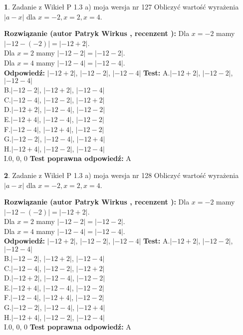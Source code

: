 \documentclass[12pt, a4paper]{article}
\theoremstyle{definition} %
\newtheorem{zad}{}
\newcommand{\zadStart}[1]{\begin{zad}#1\newline}
\newcommand{\zadStop}{\end{zad}}
\newcommand{\rozwStart}[2]{\noindent \textbf{Rozwiązanie (autor #1 , recenzent #2): }\newline}
\newcommand{\rozwStop}{\newline}
\newcommand{\odpStart}{\noindent \textbf{Odpowiedź:}\newline}
\newcommand{\odpStop}{\newline}
\newcommand{\testStart}{\noindent \textbf{Test:}\newline}
\newcommand{\testStop}{\newline}
\newcommand{\kluczStart}{\noindent \textbf{Test poprawna odpowiedź:}\newline}
\newcommand{\kluczStop}{\newline}
\begin{document}
\zadStart{Zadanie z Wikieł P 1.3 a) moja wersja nr 127}
Obliczyć wartość wyrażenia $|a - x|$ dla $x=-2,x=2,x=4$.
\zadStop
\rozwStart{Patryk Wirkus}{}
Dla $x = -2$ mamy $|-12 - (-2)| = |-12 + 2|$.\\
Dla $x = 2$ mamy $|-12 - 2| = |-12 - 2|$.\\
Dla $x = 4$ mamy $|-12 - 4| = |-12 - 4|$.\\
\rozwStop
\odpStart
$|-12 + 2|$, $|-12 - 2|$, $|-12 - 4|$
\odpStop
\testStart
A.$|-12 + 2|$, $|-12 - 2|$, $|-12 - 4|$\\
B.$|-12 - 2|$, $|-12 + 2|$, $|-12 - 4|$\\
C.$|-12 - 4|$, $|-12 - 2|$, $|-12 + 2|$\\
D.$|-12 + 2|$, $|-12 - 4|$, $|-12 - 2|$\\
E.$|-12 + 4|$, $|-12 - 4|$, $|-12 - 2|$\\
F.$|-12 - 4|$, $|-12 + 4|$, $|-12 - 2|$\\
G.$|-12 - 2|$, $|-12 - 4|$, $|-12 + 4|$\\
H.$|-12 + 4|$, $|-12 - 2|$, $|-12 - 4|$\\
I.$0$, $0$, $0$
\testStop
\kluczStart
A
\kluczStop



\zadStart{Zadanie z Wikieł P 1.3 a) moja wersja nr 128}
Obliczyć wartość wyrażenia $|a - x|$ dla $x=-2,x=2,x=4$.
\zadStop
\rozwStart{Patryk Wirkus}{}
Dla $x = -2$ mamy $|-12 - (-2)| = |-12 + 2|$.\\
Dla $x = 2$ mamy $|-12 - 2| = |-12 - 2|$.\\
Dla $x = 4$ mamy $|-12 - 4| = |-12 - 4|$.\\
\rozwStop
\odpStart
$|-12 + 2|$, $|-12 - 2|$, $|-12 - 4|$
\odpStop
\testStart
A.$|-12 + 2|$, $|-12 - 2|$, $|-12 - 4|$\\
B.$|-12 - 2|$, $|-12 + 2|$, $|-12 - 4|$\\
C.$|-12 - 4|$, $|-12 - 2|$, $|-12 + 2|$\\
D.$|-12 + 2|$, $|-12 - 4|$, $|-12 - 2|$\\
E.$|-12 + 4|$, $|-12 - 4|$, $|-12 - 2|$\\
F.$|-12 - 4|$, $|-12 + 4|$, $|-12 - 2|$\\
G.$|-12 - 2|$, $|-12 - 4|$, $|-12 + 4|$\\
H.$|-12 + 4|$, $|-12 - 2|$, $|-12 - 4|$\\
I.$0$, $0$, $0$
\testStop
\kluczStart
A
\kluczStop
\end{document}

